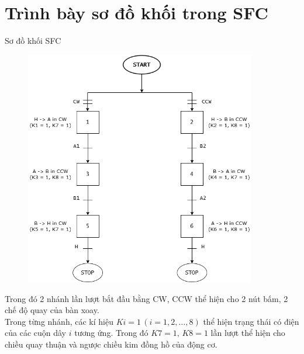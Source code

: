 \section{Trình bày sơ đồ khối trong SFC}
Sơ đồ khối SFC  
\begin{figure}[H]
    \centering
    \includegraphics[width=0.9\textwidth]{pictures/SFC.png}
\end{figure}
Trong đó 2 nhánh lần lượt bắt đầu bằng CW, CCW thể hiện cho 2 nút bấm, 2 chế độ quay của bàn xoay.\\
Trong từng nhánh, các kí hiệu $Ki = 1 \,(i = 1, 2, \dots ,8)$ thể hiện trạng thái có điện của các cuộn dây $i$ tương ứng.
Trong đó $K7 = 1, \,K8 = 1$ lần lượt thể hiện cho chiều quay thuận và ngược chiều kim đồng hồ của động cơ.
\cleardoublepage